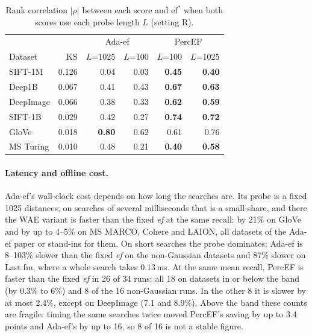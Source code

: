 \documentclass[sigconf,review=false,screen]{acmart}
\newcommand{\ef}{\textit{ef}}
\begin{document}
\begin{table}[t]
  \caption{Rank correlation $|\rho|$ between each score and $\mathrm{ef}^*$ when both scores use
  each probe length $L$ (setting R).}
  \label{tab:ablation}
  \centering\footnotesize
  \begin{tabular}{lrrrrr}
    \toprule
    & & \multicolumn{2}{c}{Ada-ef} & \multicolumn{2}{c}{PercEF} \\
    Dataset & KS & $L$=1025 & $L$=100 & $L$=100 & $L$=1025 \\
    \midrule
    SIFT-1M   & 0.126 & 0.04 & 0.03 & \textbf{0.45} & \textbf{0.40} \\
    Deep1B    & 0.067 & 0.41 & 0.43 & \textbf{0.67} & \textbf{0.63} \\
    DeepImage & 0.066 & 0.38 & 0.33 & \textbf{0.62} & \textbf{0.59} \\
    SIFT-1B   & 0.029 & 0.42 & 0.27 & \textbf{0.74} & \textbf{0.72} \\
    GloVe     & 0.018 & \textbf{0.80} & 0.62 & 0.61 & 0.76 \\
    MS Turing & 0.010 & 0.48 & 0.21 & \textbf{0.40} & \textbf{0.58} \\
    \bottomrule
  \end{tabular}
\end{table}

\paragraph{Latency and offline cost.}\label{sec:latency}
Ada-ef's wall-clock cost depends on how long the searches are. Its probe is a fixed 1025 distances;
on searches of several milliseconds that is a small share, and there the WAE variant is faster than
the fixed \ef{} at the same recall: by 21\% on GloVe and by up to 4--5\% on MS MARCO, Cohere and
LAION, all datasets of the Ada-ef paper or stand-ins for them. On short searches the probe dominates:
Ada-ef is 8--103\% slower than the fixed \ef{} on the non-Gaussian datasets and 87\% slower on
Last.fm, where a whole search takes 0.13\,ms. At the same mean recall, PercEF is faster than the
fixed \ef{} in 26 of 34 runs: all 18 on datasets in or below the band (by 0.3\% to 6\%) and 8 of
the 16 non-Gaussian runs. In the other 8 it is slower by at most 2.4\%, except on DeepImage (7.1
and 8.9\%). Above the band these counts are fragile: timing the same searches twice moved PercEF's
saving by up to 3.4 points and Ada-ef's by up to 16, so 8 of 16 is not a stable figure.
\end{document}
